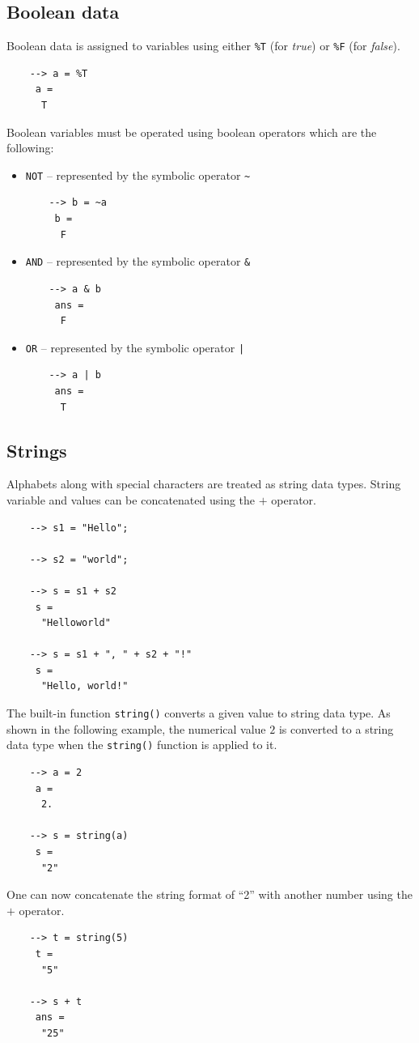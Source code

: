 	\subsection{Boolean data} \label{ssec:boolean-data}
		Boolean data is assigned to variables using either \texttt{\%T} (for \textit{true}) or \texttt{\%F} (for \textit{false}).
        \begin{verbatim}
	--> a = %T
	 a =
	  T
		\end{verbatim}
		Boolean variables must be operated using boolean operators which are the following:
		\begin{itemize}
			\item \texttt{NOT} -- represented by the symbolic operator \texttt{\~{}}
			\begin{verbatim}
	--> b = ~a    
	 b = 
	  F
			\end{verbatim}
			
			\item \texttt{AND} -- represented by the symbolic operator \texttt{\&}
			\begin{verbatim}
	--> a & b
	 ans =
	  F
			\end{verbatim}
			
			\item \texttt{OR} -- represented by the symbolic operator \texttt{|}
			\begin{verbatim}
	--> a | b
	 ans =
	  T
			\end{verbatim}
		\end{itemize}
		
	\subsection{Strings}
		Alphabets along with special characters are treated as string data types. String variable and values can be concatenated using the \texttt{$+$} operator.
		\begin{verbatim}
	--> s1 = "Hello";
	
	--> s2 = "world";
	
	--> s = s1 + s2    
	 s =     
	  "Helloworld"
	
	--> s = s1 + ", " + s2 + "!"    
	 s =     
	  "Hello, world!"
		\end{verbatim}
		
		The built-in function \texttt{string()} converts a given value to string data type. As shown in the following example, the numerical value $2$ is converted to a string data type when the \texttt{string()} function is applied to it.
		\begin{verbatim}
	--> a = 2
	 a =     
	  2.
			
	--> s = string(a)    
	 s =     
	  "2"
		\end{verbatim}
		One can now concatenate the string format of ``2'' with another number using the \texttt{$+$} operator.
		\begin{verbatim}
	--> t = string(5)    
	 t =     
	  "5"
			
	--> s + t    
	 ans =     
	  "25"
		\end{verbatim}
		
